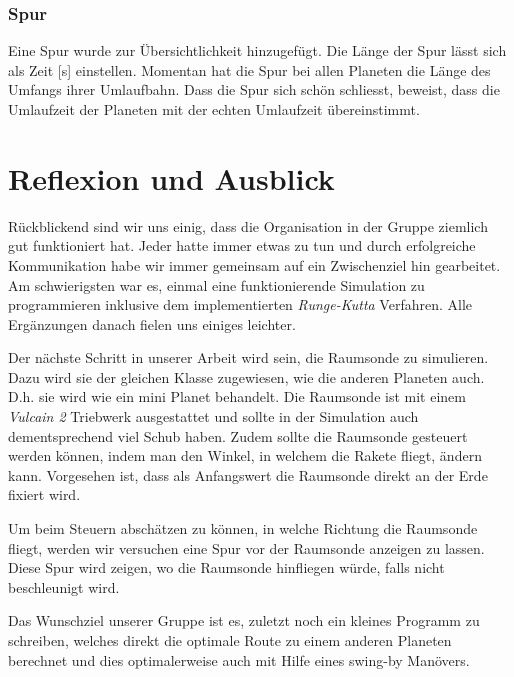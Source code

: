 \documentclass{article}
\begin{document}
\subsubsection{Spur}
Eine Spur wurde zur Übersichtlichkeit hinzugefügt. Die Länge der Spur lässt sich als Zeit [s] einstellen. Momentan hat die Spur bei allen Planeten die Länge des Umfangs ihrer Umlaufbahn. Dass die Spur sich schön schliesst, beweist, dass die Umlaufzeit der Planeten mit der echten Umlaufzeit übereinstimmt.


\section{Reflexion und Ausblick}
Rückblickend sind wir uns einig, dass die Organisation in der Gruppe ziemlich gut funktioniert hat. Jeder hatte immer etwas zu tun und durch erfolgreiche Kommunikation habe wir immer gemeinsam auf ein Zwischenziel hin gearbeitet. Am schwierigsten war es, einmal eine funktionierende Simulation zu programmieren inklusive dem implementierten \textit{Runge-Kutta} Verfahren. Alle Ergänzungen danach fielen uns einiges leichter. 


Der nächste Schritt in unserer Arbeit wird sein, die Raumsonde zu simulieren. Dazu wird sie der gleichen Klasse zugewiesen, wie die anderen Planeten auch. D.h. sie wird wie ein mini Planet behandelt. Die Raumsonde ist mit einem \textit{Vulcain 2} Triebwerk ausgestattet und sollte in der Simulation auch dementsprechend viel Schub haben. Zudem sollte die Raumsonde gesteuert werden können, indem man den Winkel, in welchem die Rakete fliegt, ändern kann. Vorgesehen ist, dass als Anfangswert die Raumsonde direkt an der Erde fixiert wird. 

Um beim Steuern abschätzen zu können, in welche Richtung die Raumsonde fliegt, werden wir versuchen eine Spur vor der Raumsonde anzeigen zu lassen. Diese Spur wird zeigen, wo die Raumsonde hinfliegen würde, falls nicht beschleunigt wird.

Das Wunschziel unserer Gruppe ist es, zuletzt noch ein kleines Programm zu schreiben, welches direkt die optimale Route zu einem anderen Planeten berechnet und dies optimalerweise auch mit Hilfe eines swing-by Manövers.
\end{document}
